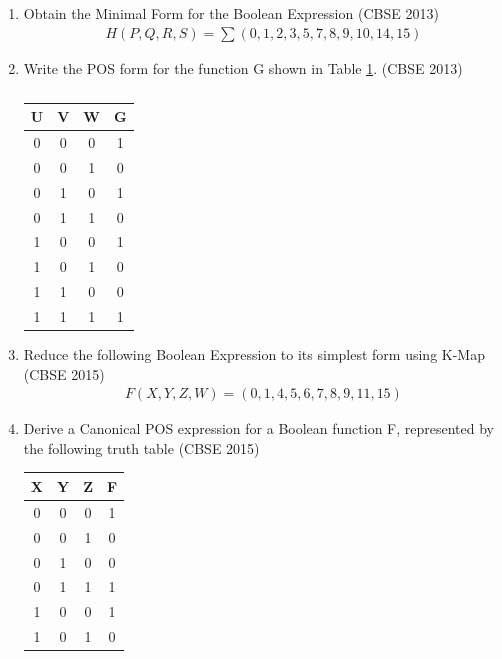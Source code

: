 \begin{enumerate}
	\item 		Obtain the Minimal Form for the Boolean Expression
\label{prob:2013/d/6/d}
\hfill (CBSE 2013)
		\begin{align}
\label{eq:2013/d/6/d}
H(P,Q,R,S)=\sum(0,1,2,3,5,7,8,9,10,14,15)
		\end{align}
	\item Write the POS form for the function G shown in Table
\ref{tab:2013/c/6/d}.
\label{prob:2013/c/6/d}
\hfill (CBSE 2013)
		\begin{table}[!ht]
			\centering
		\begin{tabular}{ |c |c |c |c |}
 \hline
 U  &  V  &  W  &  G\\
 \hline
 0  &  0  &  0  &  1\\
 \hline
 0  &  0  &  1  &  0\\
 \hline
 0  &  1  &  0  &  1\\
 \hline
 0  &  1  &  1  &  0\\
 \hline
 1  &  0  &  0  &  1\\
 \hline
 1  &  0  &  1  &  0\\
 \hline
 1  &  1  &  0  &  0\\
 \hline
 1  &  1  &  1  &  1\\
 \hline
 \end{tabular}
			\caption{}
\label{tab:2013/c/6/d}
 \end{table}
	\item Reduce the following Boolean Expression to its simplest form using K-Map 
\label{prob:2015-1/c/6/d}
\hfill (CBSE 2015)
		\begin{align}
\label{eq:2015-1/c/6/d}
			F(X,Y,Z,W)=(0,1,4,5,6,7,8,9,11,15)
		\end{align}
	\item 
		Derive a Canonical POS expression for a Boolean function F, represented by the following truth table 
\label{prob:2015-1/c/6/c}
\hfill (CBSE 2015)
		\begin{table}[!ht]
			\centering
		\begin{tabular}{|c|c|c|c|}
	\hline
X & Y & Z & F \\
\hline
0 & 0 & 0 & 1 \\  
\hline
0 & 0 & 1 & 0 \\ 
\hline
0 & 1 & 0 & 0 \\
\hline
0 & 1 & 1 & 1 \\
\hline
1 & 0 & 0 & 1 \\  
\hline
1 & 0 & 1 & 0 \\ 

\end{tabular}
\end{table}
\end{enumerate}
